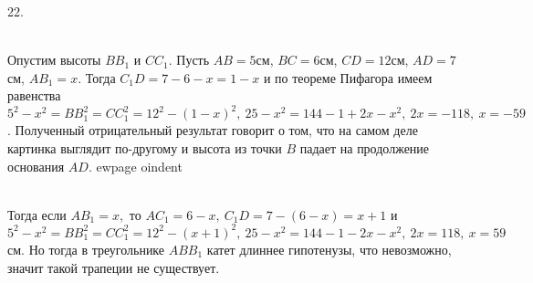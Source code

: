 22. \begin{figure}[ht!]
\end{figure}\\
Опустим высоты $BB_1$ и $CC_1.$ Пусть $AB=5$см, $BC=6$см, $CD=12$см, $AD=7$см, $AB_1=x.$ Тогда $C_1D=7-6-x=1-x$ и по теореме Пифагора имеем равенства
$5^2-x^2=BB_1^2=CC_1^2=12^2-(1-x)^2,\ 25-x^2=144-1+2x-x^2,\ 2x=-118,\ x=-59$. Полученный отрицательный результат говорит о том, что на самом деле картинка выглядит по-другому и высота из точки $B$ падает на продолжение основания $AD.$
ewpage
oindent
\begin{figure}[ht!]
\end{figure}\\
Тогда если $AB_1=x,$ то $AC_1=6-x,\ C_1D=7-(6-x)=x+1$ и $5^2-x^2=BB_1^2=CC_1^2=12^2-(x+1)^2,\ 25-x^2=144-1-2x-x^2,\ 2x=118,\ x=59$см. Но тогда в треугольнике
$ABB_1$ катет длиннее гипотенузы, что невозможно, значит такой трапеции не существует.\\
